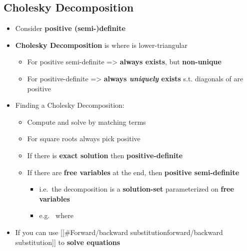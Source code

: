 \subsection*{Cholesky Decomposition}

\begin{itemize}

\item
  Consider \textbf{positive (semi-)definite}
\item
  \textbf{Cholesky Decomposition} is  where 
  is lower-triangular

  \begin{itemize}
  
  \item
    For positive semi-definite =\textgreater{} \textbf{always exists},
    but \textbf{non-unique}
  \item
    For positive-definite =\textgreater{} \textbf{always \emph{uniquely}
    exists} s.t. diagonals of  are positive
  \end{itemize}
\item
  Finding a Cholesky Decomposition:

  \begin{itemize}
  
  \item
    Compute  and solve  by matching terms
  \item
    For square roots always pick positive
  \item
    If there is \textbf{exact solution} then \textbf{positive-definite}
  \item
    If there are \textbf{free variables} at the end, then
    \textbf{positive semi-definite}

    \begin{itemize}
    
    \item
      i.e.~the decomposition is a \textbf{solution-set} parameterized on
      \textbf{free variables}
    \item
      e.g.~
      where
    \end{itemize}
  \end{itemize}
\item
  If  you can use {[}{[}\#Forward/backward
  substitution\textbar forward/backward substitution{]}{]} to
  \textbf{solve equations}


\end{itemize}
